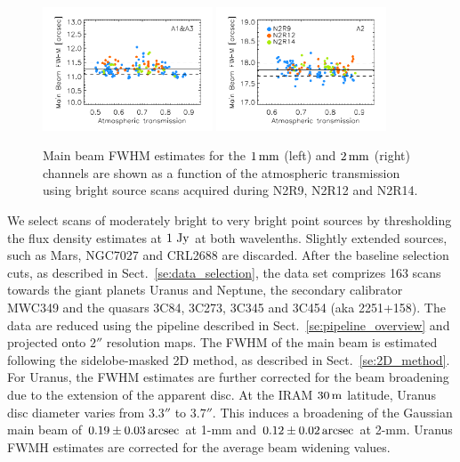 \begin{figure}[ht!]
\begin{center}
  \includegraphics[clip, width=0.45\textwidth]{Figures/Beams/plot_FWHM_vs_atmtrans_mb_radius_binning2_1mm.pdf}
  \includegraphics[clip, width=0.45\textwidth]{Figures/Beams/plot_FWHM_vs_atmtrans_mb_radius_binning2_a2.pdf}
  \caption[Main Beam FWHM]{Main beam FWHM estimates for the $1\,\rm{mm}$ (left) and $2\,\rm{mm}$ (right) channels are shown as a function of the atmospheric transmission using bright source scans acquired during N2R9, N2R12 and N2R14. }
\label{fig:fwhm_map_atmtrans}
\end{center}
\end{figure}

We select scans of moderately bright to very bright point sources by
thresholding the flux density estimates at $1~\rm{Jy}$ at both
wavelenths. Slightly extended sources, such as Mars, NGC7027 and
CRL2688 are discarded. After the baseline selection cuts, as described in
Sect.~\ref{se:data_selection}, the data set comprizes 163 scans
towards the giant planets Uranus and Neptune, the secondary calibrator
MWC349 and the quasars 3C84, 3C273, 3C345 and 3C454 (aka
2251+158). The data are reduced using the pipeline described in
Sect.~\ref{se:pipeline_overview} and projected onto $2''$ resolution
maps. The FWHM of the main beam is estimated following the
sidelobe-masked 2D method, as described in Sect.~\ref{se:2D_method}.
For Uranus, the
FWHM estimates are further corrected for the beam broadening due to the
extension of the apparent
disc. At the IRAM $30\,\rm{m}$ latitude, Uranus disc diameter varies
from $3.3''$ to $3.7''$. This induces a broadening of the Gaussian main beam of
$0.19 \pm 0.03\,\rm{arcsec}$ at 1-mm and $0.12 \pm 0.02\,\rm{arcsec}$
at 2-mm. Uranus FWMH estimates are corrected for the average beam
widening values.


